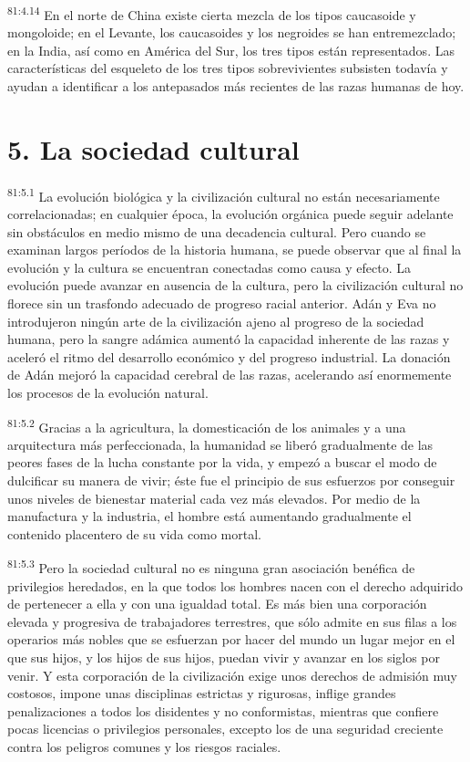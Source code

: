 \par
\textsuperscript{81:4.14} En el norte de China existe cierta mezcla de los tipos caucasoide y mongoloide; en el Levante, los caucasoides y los negroides se han entremezclado; en la India, así como en América del Sur, los tres tipos están representados. Las características del esqueleto de los tres tipos sobrevivientes subsisten todavía y ayudan a identificar a los antepasados más recientes de las razas humanas de hoy.

\section*{5. La sociedad cultural}
\par
\textsuperscript{81:5.1} La evolución biológica y la civilización cultural no están necesariamente correlacionadas; en cualquier época, la evolución orgánica puede seguir adelante sin obstáculos en medio mismo de una decadencia cultural. Pero cuando se examinan largos períodos de la historia humana, se puede observar que al final la evolución y la cultura se encuentran conectadas como causa y efecto. La evolución puede avanzar en ausencia de la cultura, pero la civilización cultural no florece sin un trasfondo adecuado de progreso racial anterior. Adán y Eva no introdujeron ningún arte de la civilización ajeno al progreso de la sociedad humana, pero la sangre adámica aumentó la capacidad inherente de las razas y aceleró el ritmo del desarrollo económico y del progreso industrial. La donación de Adán mejoró la capacidad cerebral de las razas, acelerando así enormemente los procesos de la evolución natural.

\par
\textsuperscript{81:5.2} Gracias a la agricultura, la domesticación de los animales y a una arquitectura más perfeccionada, la humanidad se liberó gradualmente de las peores fases de la lucha constante por la vida, y empezó a buscar el modo de dulcificar su manera de vivir; éste fue el principio de sus esfuerzos por conseguir unos niveles de bienestar material cada vez más elevados. Por medio de la manufactura y la industria, el hombre está aumentando gradualmente el contenido placentero de su vida como mortal.

\par
\textsuperscript{81:5.3} Pero la sociedad cultural no es ninguna gran asociación benéfica de privilegios heredados, en la que todos los hombres nacen con el derecho adquirido de pertenecer a ella y con una igualdad total. Es más bien una corporación elevada y progresiva de trabajadores terrestres, que sólo admite en sus filas a los operarios más nobles que se esfuerzan por hacer del mundo un lugar mejor en el que sus hijos, y los hijos de sus hijos, puedan vivir y avanzar en los siglos por venir. Y esta corporación de la civilización exige unos derechos de admisión muy costosos, impone unas disciplinas estrictas y rigurosas, inflige grandes penalizaciones a todos los disidentes y no conformistas, mientras que confiere pocas licencias o privilegios personales, excepto los de una seguridad creciente contra los peligros comunes y los riesgos raciales.

